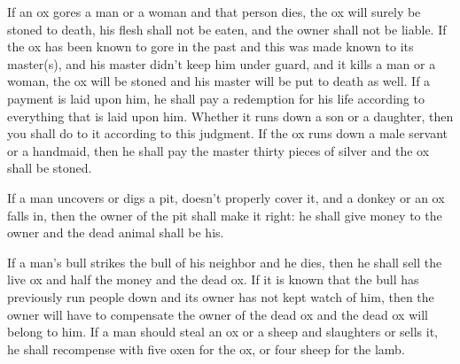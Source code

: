 \begin{inparaenum}
   If an ox gores a man or a woman and that person dies, the ox will surely be stoned to death, his flesh shall not be eaten, and the owner shall not be liable.%
   If the ox has been known to gore in the past and this was made known to its master(s), and his master didn't keep him under guard, and it kills a man or a woman, the ox will be stoned and his master will be put to death as well.%
   If a payment is laid upon him, he shall pay a redemption for his life according to everything that is laid upon him.%
   Whether it runs down a son or a daughter, then you shall do to it according to this judgment.%
   If the ox runs down a male servant or a handmaid, then he shall pay the master thirty pieces of silver and the ox shall be stoned.%
  
   If a man uncovers or digs a pit, doesn't properly cover it, and a donkey or an ox falls in,%
   then the owner of the pit shall make it right: he shall give money to the owner and the dead animal shall be his.%
  
   If a man's bull strikes the bull of his neighbor and he dies, then he shall sell the live ox and half the money and the dead ox.%
   If it is known that the bull has previously run people down and its owner has not kept watch of him, then the owner will have to compensate the owner of the dead ox and the dead ox will belong to him.%
   If a man should steal an ox or a sheep and slaughters or sells it, he shall recompense with five oxen for the ox, or four sheep for the lamb.%
\end{inparaenum}
